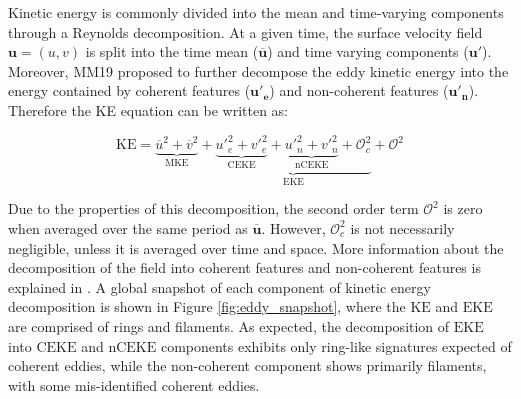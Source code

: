 \documentclass[draft,linenumbers]{agujournal2019}
\newcommand{\mKE}{\textrm{MKE}}
\newcommand{\KE}{\textrm{KE}}
\newcommand{\EKE}{\textrm{EKE}}
\newcommand{\CEKE}{\textrm{CEKE}}
\newcommand{\nCEKE}{\textrm{nCEKE}}
\begin{document}
	Kinetic energy is commonly divided into the mean and time-varying components through a Reynolds decomposition. At a given time, the surface velocity field $\mathbf{u} = (u,v)$ is split into the time mean ($\mathbf{\overline{u}}$) and time varying components ($\mathbf{u'}$). Moreover, MM19 proposed to further decompose the eddy kinetic energy into the energy contained by coherent features ($\mathbf{u'_e}$) and non-coherent features ($\mathbf{u'_n}$). Therefore the KE equation can be written as:
	
	\begin{equation}
		\mathrm{KE} = \underbrace{\overline{u}^2 + \overline{v}^2}_{\mKE} + 
		\underbrace{\underbrace{{u'}_e^2+{v'}_e^2}_{\CEKE}  + \underbrace{{u'}_n^2+{v'}_n^2}_{\nCEKE} + \mathcal{O}_c^2 }_{\EKE} + \mathcal{O}^2
	\end{equation}

	Due to the properties of this decomposition, the second order term $\mathcal{O}^2$ is zero when averaged over the same period as $\mathbf{\overline{u}}$. However, $\mathcal{O}_c^2$ is not necessarily negligible, unless it is averaged over time and space. More information about the decomposition of the field into coherent features and non-coherent features is explained in \citet{Martinez_TKE_2019}. A global snapshot of each component of kinetic energy decomposition is shown in Figure \ref{fig:eddy_snapshot}, where the $\KE$ and $\EKE$ are comprised of rings and filaments. As expected, the decomposition of $\EKE$ into $\CEKE$ and $\nCEKE$ components exhibits only ring-like signatures expected of coherent eddies, while the non-coherent component shows primarily filaments, with some mis-identified coherent eddies.
\end{document}
